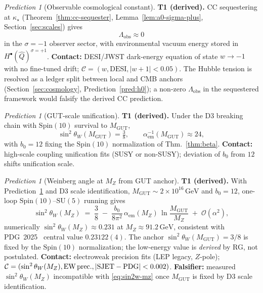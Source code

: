 \documentclass[11pt]{article}
\theoremstyle{plain}
\theoremstyle{definition}
\theoremstyle{remark}
\newtheorem{prediction}[theorem]{Prediction}
\numberwithin{equation}{section}
\newcommand{\Spin}{\mathrm{Spin}}
\begin{document}
\begin{prediction}[Observable cosmological constant]\label{pred:cc}
\textbf{T1 (derived).} CC sequestering at $\kappa_\star$
(Theorem~\ref{thm:cc-sequester}, Lemma~\ref{lem:a0-sigma-plus},
Section~\ref{sec:scales}) gives
\begin{equation}\label{eq:Lambda-obs}
  \Lambda_{\mathrm{obs}}\approx 0
\end{equation}
in the $\sigma=-1$ observer sector, with environmental vacuum energy stored in
$H^\bullet(\hat Q)^{\sigma=+1}$.
\textbf{Contact:} DESI/JWST dark-energy equation of state
$w\to -1$ with no fine-tuned drift; $\mathcal{C}=(w,\mathrm{DESI},|w+1|<0.05)$.
The Hubble tension is resolved as a ledger split between local and CMB
anchors (Section~\ref{sec:cosmology}, Prediction~\ref{pred:h0}); a non-zero
$\Lambda_{\mathrm{obs}}$ in the sequestered framework would falsify the
derived CC prediction.
\end{prediction}

\begin{prediction}[GUT-scale unification]\label{pred:gut}
\textbf{T1 (derived).} Under the D3 breaking chain with $\Spin(10)$ survival
to $M_{\mathrm{GUT}}$,
\begin{equation}\label{eq:sin2w}
  \sin^2\theta_W(M_{\mathrm{GUT}})=\tfrac38,
  \qquad
  \alpha_{\mathrm{em}}^{-1}(M_{\mathrm{GUT}})\approx 24,
\end{equation}
with $b_0=12$ fixing the $\Spin(10)$ normalization of Thm.~\ref{thm:beta}.
\textbf{Contact:} high-scale coupling unification fits (SUSY or non-SUSY);
deviation of $b_0$ from $12$ shifts unification scale.
\end{prediction}

\begin{prediction}[Weinberg angle at $M_Z$ from GUT anchor]\label{pred:sin2w-mz}
\textbf{T1 (derived).} With Prediction~\ref{pred:gut} and D3 scale identification,
$M_{\mathrm{GUT}}\sim 2\times 10^{16}\,\mathrm{GeV}$ and $b_0=12$, one-loop
$\Spin(10)$--$\mathrm{SU}(5)$ running gives
\begin{equation}\label{eq:sin2w-mz}
  \sin^2\theta_W(M_Z)
  \;=\;
  \frac38
  \;-\;
  \frac{b_0}{8\pi^2}\,\alpha_{\mathrm{em}}(M_Z)\,
  \ln\!\frac{M_{\mathrm{GUT}}}{M_Z}
  \;+\;\mathcal{O}(\alpha^2),
\end{equation}
numerically $\sin^2\theta_W(M_Z)\approx 0.231$ at $M_Z\approx 91.2\,\mathrm{GeV}$,
consistent with PDG~2025~\cite{PDG2025} central value
$0.23122(4)$. The anchor $\sin^2\theta_W(M_{\mathrm{GUT}})=3/8$ is fixed by
the $\Spin(10)$ normalization; the low-energy value is \emph{derived} by RG,
not postulated.
\textbf{Contact:} electroweak precision fits (LEP legacy, $Z$-pole);
$\mathcal{C}=(\sin^2\theta_W(M_Z),\mathrm{EW\,prec.},|{\rm SJET}-{\rm PDG}|<0.002)$.
\textbf{Falsifier:} measured $\sin^2\theta_W(M_Z)$ incompatible with
\eqref{eq:sin2w-mz} once $M_{\mathrm{GUT}}$ is fixed by D3 scale identification.
\end{prediction}
\end{document}
